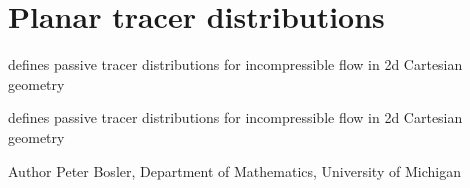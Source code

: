 \hypertarget{group___plane_tracer}{\section{Planar tracer distributions}
\label{group___plane_tracer}
}


defines passive tracer distributions for incompressible flow in 2d Cartesian geometry  


defines passive tracer distributions for incompressible flow in 2d Cartesian geometry 

\begin{DoxyAuthor}{Author}
Peter Bosler, Department of Mathematics, University of Michigan 
\end{DoxyAuthor}
